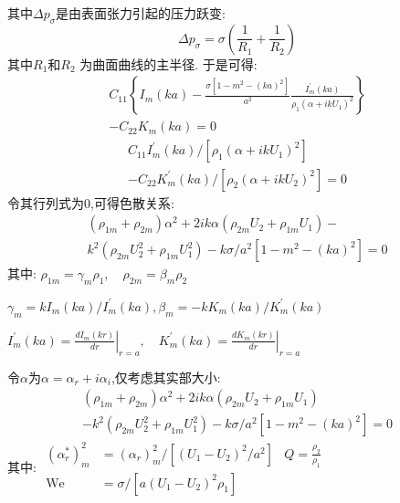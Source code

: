 \documentclass[UTF8]{gapd}
\begin{document}
其中$\Delta p_{\sigma}$是由表面张力引起的压力跃变:
\begin{equation}
\Delta p_{\sigma}=\sigma\left(\frac{1}{R_{1}}+\frac{1}{R_{2}}\right)
\end{equation}
其中$R_{1}$和$R_{2}$     为曲面曲线的主半径.
于是可得:
\begin{equation}
\begin{split}
C_{11}\left\{I_{m}(k a)-\frac{\sigma\left[1-m^{2}-(k a)^{2}\right]}{a^{2}} \frac{I_{m}^{\prime}(k a)}{\rho_{1}\left(\alpha+i k U_{1}\right)^{2}}\right\}\\-C_{22} K_{m}(k a)=0
\end{split}
\end{equation}
\begin{equation}
\begin{split}
C_{11} I_{m}^{\prime}(k a) /\left[\rho_{1}\left(\alpha+i k U_{1}\right)^{2}\right]\\-C_{22} K_{m}^{\prime}(k a) /\left[\rho_{2}\left(\alpha+i k U_{2}\right)^{2}\right]=0
\end{split}
\end{equation}
令其行列式为0,可得色散关系:
\begin{equation}
\begin{split}
\left(\rho_{1 m}+\rho_{2 m}\right) \alpha^{2}+2 i k \alpha\left(\rho_{2 m} U_{2}+\rho_{1 m} U_{1}\right)-\\
k^{2}\left(\rho_{2 m} U_{2}^{2}+\rho_{1 m} U_{1}^{2}\right)-k \sigma / a^{2}\left[1-m^{2}-(k a)^{2}\right]=0
\end{split}
\end{equation}
其中:
$\rho_{1 m}=\gamma_{m} \rho_{1}, \quad \rho_{2 m}=\beta_{m} \rho_{2}$

$\gamma _m=kI_m( ka ) /I_{m}^{'}\left( ka \right) ,\beta _m=-kK_m\left( ka \right) /K_{m}^{'}\left( ka \right) $


$I_{m}^{\prime}(k a)=\left.\frac{d I_{m}(k r)}{d r}\right|_{r=a}, \quad K_{m}^{\prime}(k a)=\left.\frac{d K_{m}(k r)}{d r}\right|_{r=a}$

令$\alpha$为$\alpha =\alpha _r+i\alpha _i$,仅考虑其实部大小:
\begin{equation}
\begin{split}
\left(\rho_{1 m}+\rho_{2 m}\right) \alpha^{2}+2 i k \alpha\left(\rho_{2 m} U_{2}+\rho_{1 m} U_{1}\right) 
\\-k^{2}\left(\rho_{2 m} U_{2}^{2}+\rho_{1 m} U_{1}^{2}\right) 
-k \sigma / a^{2}\left[1-m^{2}-(k a)^{2}\right]=0
\end{split}
\end{equation}
其中:
$\begin{aligned}\left(\alpha_{r}^{*}\right)_{m}^{2} &=\left(\alpha_{r}\right)_{m}^{2} /\left[\left(U_{1}-U_{2}\right)^{2} / a^{2}\right] & Q=\frac{\rho_{2}}{\rho_{1}} \\ \mathrm{We} &=\sigma /\left[a\left(U_{1}-U_{2}\right)^{2} \rho_{1}\right] & \end{aligned}$
\end{document}
